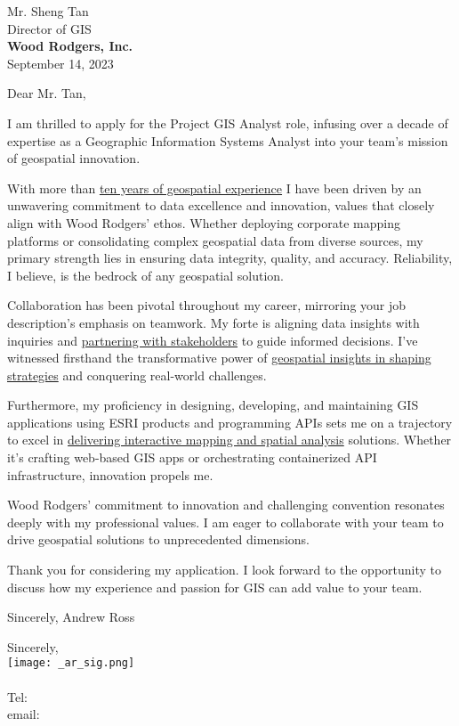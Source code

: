 \documentclass[letterpaper]{article}
\newcommand{\impt}[1]{\uline{#1}}
\begin{document}
\large

Mr. Sheng Tan \\
Director of GIS \\
\textbf{Wood Rodgers, Inc.} \\

\null\hfill September 14, 2023
\vspace{1em}

Dear Mr. Tan,

I am thrilled to apply for the Project GIS Analyst role, infusing over a decade
of expertise as a Geographic Information Systems Analyst into your team's
mission of geospatial innovation.

With more than \impt{ten years of geospatial experience} I have been driven by an unwavering
commitment to data excellence and innovation, values that closely align with
Wood Rodgers' ethos. Whether deploying corporate mapping platforms or consolidating
complex geospatial data from diverse sources, my primary strength lies in
ensuring data integrity, quality, and accuracy. Reliability, I believe, is the
bedrock of any geospatial solution.

Collaboration has been pivotal throughout my career, mirroring your job
description's emphasis on teamwork. My forte is aligning data insights with
inquiries and \impt{partnering with stakeholders} to guide informed decisions. I've
witnessed firsthand the transformative power of \impt{geospatial insights in shaping
strategies} and conquering real-world challenges.

Furthermore, my proficiency in designing, developing, and maintaining GIS
applications using ESRI products and programming APIs
sets me on a trajectory to excel in \impt{delivering interactive mapping
and spatial analysis} solutions. Whether it's crafting web-based GIS apps or
orchestrating containerized API infrastructure, innovation propels me.

Wood Rodgers' commitment to innovation and challenging convention resonates
deeply with my professional values. I am eager to collaborate with your team to
drive geospatial solutions to unprecedented dimensions.

Thank you for considering my application. I look forward to the opportunity to
discuss how my experience and passion for GIS can add value to your team.

Sincerely,
Andrew Ross

Sincerely,\\
    \hspace{1em}
    \texttt{[image: \_ar\_sig.png]} \\
    \CVsigname \\
    \small
    Tel: \CVphone \\
    email: \CVemail
\end{document}
